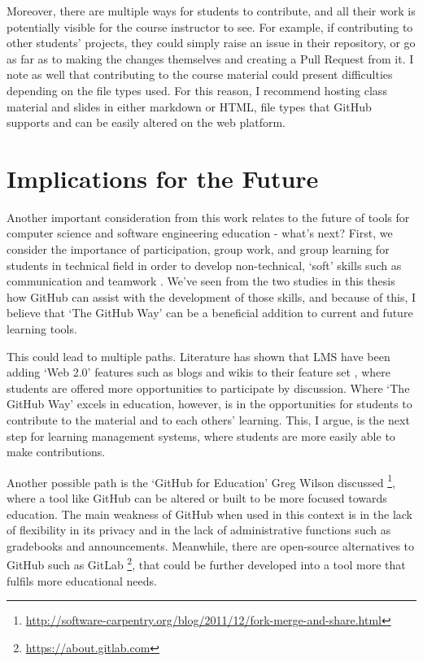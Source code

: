 Moreover, there are multiple ways for students to contribute, and all their work is potentially visible for the course instructor to see. For example, if contributing to other students' projects, they could simply raise an issue in their repository, or go as far as to making the changes themselves and creating a Pull Request from it. I note as well that contributing to the course material could present difficulties depending on the file types used. For this reason, I recommend hosting class material and slides in either markdown or HTML, file types that GitHub supports and can be easily altered on the web platform.

\section{Implications for the Future}
Another important consideration from this work relates to the future of tools for computer science and software engineering education - what's next? First, we consider the importance of participation, group work, and group learning for students in technical field in order to develop non-technical, `soft' skills such as communication and teamwork \cite{jazayeri2004education}. We've seen from the two studies in this thesis how GitHub can assist with the development of those skills, and because of this, I believe that `The GitHub Way' can be a beneficial addition to current and future learning tools.

This could lead to multiple paths. Literature has shown that LMS have been adding `Web 2.0' features such as blogs and wikis to their feature set \cite{downes2005feature}, where students are offered more opportunities to participate by discussion. Where `The GitHub Way' excels in education, however, is in the opportunities for students to contribute to the material and to each others' learning. This, I argue, is the next step for learning management systems, where students are more easily able to make contributions.

Another possible path is the `GitHub for Education' Greg Wilson discussed \footnote{\url{http://software-carpentry.org/blog/2011/12/fork-merge-and-share.html}}, where a tool like GitHub can be altered or built to be more focused towards education. The main weakness of GitHub when used in this context is in the lack of flexibility in its privacy and in the lack of administrative functions such as gradebooks and announcements. Meanwhile, there are open-source alternatives to GitHub such as GitLab \footnote{\url{https://about.gitlab.com}}, that could be further developed into a tool more that fulfils more educational needs.

